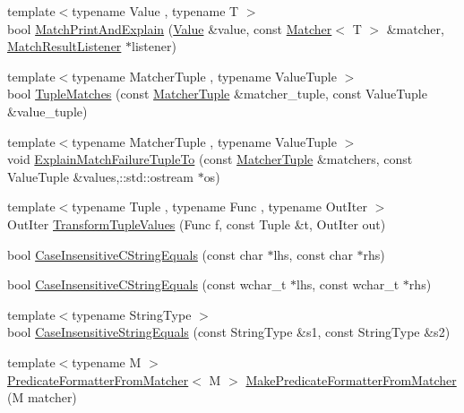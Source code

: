 \begin{DoxyCompactItemize}
\item 
{\footnotesize template$<$typename Value , typename T $>$ }\\bool \hyperlink{namespacetesting_1_1internal_a0821df2611d54c79bac990719ad8a2dd}{Match\+Print\+And\+Explain} (\hyperlink{namespacetesting_ae44c50a3a7f0a46f05c8a0b0592b4a62}{Value} \&value, const \hyperlink{classtesting_1_1Matcher}{Matcher}$<$ T $>$ \&matcher, \hyperlink{classtesting_1_1MatchResultListener}{Match\+Result\+Listener} $\ast$listener)
\item 
{\footnotesize template$<$typename Matcher\+Tuple , typename Value\+Tuple $>$ }\\bool \hyperlink{namespacetesting_1_1internal_a10095d1e1c99369200072b39d657ebc4}{Tuple\+Matches} (const \hyperlink{structtesting_1_1internal_1_1MatcherTuple}{Matcher\+Tuple} \&matcher\+\_\+tuple, const Value\+Tuple \&value\+\_\+tuple)
\item 
{\footnotesize template$<$typename Matcher\+Tuple , typename Value\+Tuple $>$ }\\void \hyperlink{namespacetesting_1_1internal_afc791c20a43da984032e598698ac6ac4}{Explain\+Match\+Failure\+Tuple\+To} (const \hyperlink{structtesting_1_1internal_1_1MatcherTuple}{Matcher\+Tuple} \&matchers, const Value\+Tuple \&values,\+::std\+::ostream $\ast$os)
\item 
{\footnotesize template$<$typename Tuple , typename Func , typename Out\+Iter $>$ }\\Out\+Iter \hyperlink{namespacetesting_1_1internal_a07ba091a64aa2ba95e41accc55dc8855}{Transform\+Tuple\+Values} (Func f, const Tuple \&t, Out\+Iter out)
\item 
bool \hyperlink{namespacetesting_1_1internal_aebfd0cd34de52d7973a5b2d03ba848cf}{Case\+Insensitive\+C\+String\+Equals} (const char $\ast$lhs, const char $\ast$rhs)
\item 
bool \hyperlink{namespacetesting_1_1internal_ad5b31f61a3cc5b4226d3560f5b48f4dd}{Case\+Insensitive\+C\+String\+Equals} (const wchar\+\_\+t $\ast$lhs, const wchar\+\_\+t $\ast$rhs)
\item 
{\footnotesize template$<$typename String\+Type $>$ }\\bool \hyperlink{namespacetesting_1_1internal_a383de24b1cca6648c14b03964c0ed843}{Case\+Insensitive\+String\+Equals} (const String\+Type \&s1, const String\+Type \&s2)
\item 
{\footnotesize template$<$typename M $>$ }\\\hyperlink{classtesting_1_1internal_1_1PredicateFormatterFromMatcher}{Predicate\+Formatter\+From\+Matcher}$<$ M $>$ \hyperlink{namespacetesting_1_1internal_a3fd0f30ec03d577bba3e1aa13241e17d}{Make\+Predicate\+Formatter\+From\+Matcher} (M matcher)

\end{DoxyCompactItemize}
